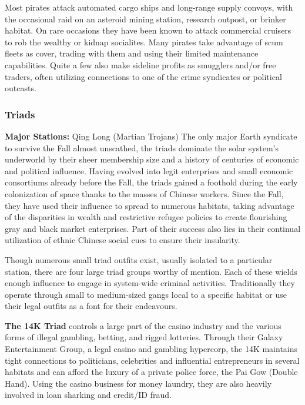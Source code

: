 Most pirates attack automated cargo ships and long-range
supply convoys, with the occasional raid on an
asteroid mining station, research outpost, or brinker 
habitat. On rare occasions they have been known 
to attack commercial cruisers to rob the wealthy or 
kidnap socialites. Many pirates take advantage of 
scum fleets as cover, trading with them and using their 
limited maintenance capabilities. Quite a few also 
make sideline profits as smugglers and/or free traders, 
often utilizing connections to one of the crime syndicates
or political outcasts.

\subsubsection{Triads}

\textbf{Major Stations: }Qing Long (Martian Trojans)
The only major Earth syndicate to survive the Fall 
almost unscathed, the triads dominate the solar 
system's underworld by their sheer membership size 
and a history of centuries of economic and political 
influence. Having evolved into legit enterprises and 
small economic consortiums already before the Fall, 
the triads gained a foothold during the early colonization
of space thanks to the masses of Chinese workers.
Since the Fall, they have used their influence to spread 
to numerous habitats, taking advantage of the disparities
in wealth and restrictive refugee policies to create
flourishing gray and black market enterprises. Part of 
their success also lies in their continual utilization of 
ethnic Chinese social cues to ensure their insularity.

Though numerous small triad outfits exist, usually 
isolated to a particular station, there are four large 
triad groups worthy of mention. Each of these wields 
enough influence to engage in system-wide criminal 
activities. Traditionally they operate through small to 
medium-sized gangs local to a specific habitat or use 
their legal outfits as a font for their endeavours.

\textbf{The 14K Triad} controls a large part of the casino 
industry and the various forms of illegal gambling, 
betting, and rigged lotteries. Through their Galaxy 
Entertainment Group, a legal casino and gambling 
hypercorp, the 14K maintains tight connections to 
politicians, celebrities and influential entrepreneurs in 
several habitats and can afford the luxury of a private 
police force, the Pai Gow (Double Hand). Using the 
casino business for money laundry, they are also heavily
involved in loan sharking and credit/ID fraud.

